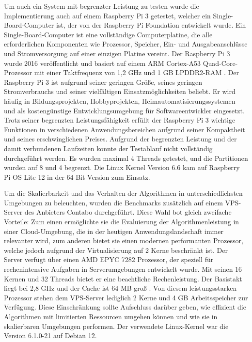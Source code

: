 Um auch ein System mit begrenzter Leistung zu testen wurde die Implementierung auch auf einem  Raspberry Pi 3 getestet, welcher ein Single-Board-Computer ist, der von der Raspberry Pi Foundation entwickelt wurde. Ein Single-Board-Computer ist eine vollständige Computerplatine, die alle erforderlichen Komponenten wie Prozessor, Speicher, Ein- und Ausgabeanschlüsse und Stromversorgung auf einer einzigen Platine vereint. Der Raspberry Pi 3 wurde 2016 veröffentlicht und basiert auf einem ARM Cortex-A53 Quad-Core-Prozessor mit einer Taktfrequenz von 1,2 GHz und 1 GB LPDDR2-RAM \citep{RaspberryPi_Technische_Daten}.
Der Raspberry Pi 3 ist aufgrund seiner geringen Größe, seines geringen Stromverbrauchs und seiner vielfältigen Einsatzmöglichkeiten beliebt. Er wird häufig in Bildungsprojekten, Hobbyprojekten, Heimautomatisierungssystemen und als kostengünstige Entwicklungsumgebung für Softwareentwickler eingesetzt. Trotz seiner begrenzten Leistungsfähigkeit erfüllt der Raspberry Pi 3 wichtige Funktionen in verschiedenen Anwendungsbereichen aufgrund seiner Kompaktheit und seines erschwinglichen Preises.
Aufgrund der begrenzten Leistung und der damit verbundenen Laufzeiten konnte der Testablauf nicht vollständig durchgeführt werden. Es wurden maximal 4 Threads getestet, und die Partitionen wurden auf 8 und 4 begrenzt. Die Linux Kernel Version 6.6 kam auf Raspberry Pi OS Lite 12 in der 64-Bit Version zum Einsatz.

Um die Skalierbarkeit und das Verhalten der Algorithmen in unterschiedlichsten Umgebungen zu beleuchten, wurden die Benchmarks zusätzlich auf einem VPS-Server des Anbieters Contabo durchgeführt. Diese Wahl bot gleich zweifache Vorteile: Zum einen ermöglichte sie die Evaluierung der Algorithmenleistung in einer Cloud-Umgebung, die in der heutigen Anwendungslandschaft immer relevanter wird, zum anderen bietet sie einen modernen performanten Prozessor, welche jedoch aufgrund der Virtualisierung auf 2 Kerne beschränkt ist.
Der Server verfügt über einen AMD EPYC 7282 Prozessor, der speziell für rechenintensive Aufgaben in Serverumgebungen entwickelt wurde. Mit seinen 16 Kernen und 32 Threads bietet er eine beachtliche Rechenleistung. Der Basistakt liegt bei 2,8 GHz und der Cache ist 64 MB groß \citep{Epyc_Specifications}.
Von diesem leistungsstarken Prozessor stehen dem VPS-Server lediglich 2 Kerne und 4 GB Arbeitsspeicher zur Verfügung. Diese Einschränkung sollte Aufschluss darüber geben, wie effizient die Algorithmen mit limitierten Ressourcen umgehen können und wie sie in skalierbaren Umgebungen performen. Der verwendete Linux-Kernel war die Version 6.1.0-21 auf Debian 12.

